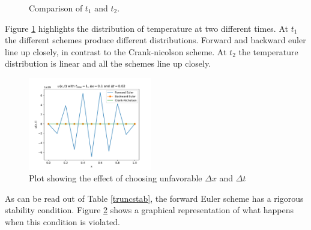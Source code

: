 \documentclass[10pt,a4paper]{article}
\begin{document}
\begin{figure}[H]
 	\centering
  	\caption{\label{fig:5c}Comparison of $t_1$ and $t_2$.}
\end{figure}

\noindent Figure \ref{fig:5c} highlights the distribution of temperature at two different times. At $t_1$ the different schemes produce different distributions. Forward and backward euler line up closely, in contrast to the Crank-nicolson scheme. At $t_2$ the temperature distribution is linear and all the schemes line up closely. 

\begin{figure} [H]
	\centering
	\includegraphics[width=0.48\textwidth]{../plots/unstable.pdf}
	\caption{\label{fig:unstable} Plot showing the effect of choosing unfavorable $\Delta x$ and $\Delta t$}
\end{figure}

\noindent As can be read out of Table \ref{truncstab}, the forward Euler scheme has a rigorous stability condition. Figure \ref{fig:unstable} shows a graphical representation of what happens when this condition is violated. 
\end{document}
